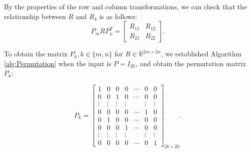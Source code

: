 \documentclass[12pt]{article}
\begin{document}
 \fi

By the properties of the row and column transformations, we can check that the relationship between $R$ and $R_4$ is as follows:
\begin{equation}\label{eq:Rn}
    P_{m} R P_{n}^T = \begin{bmatrix} R_{11} & R_{12}\\R_{21}& R_{22}\end{bmatrix}.
\end{equation}

To obtain the matrix $P_k, k\in \{m,n\}$ for $R \in \mathbb{R}^{2m \times 2n}$, we established Algorithm \ref{alg:Permutation} when the input is $P=I_{2k}$, and obtain the permutation matrix $P_k$:

\begin{equation}\label{p}
    P_k = \begin{bmatrix} 
            1 & 0 & 0 & 0 & \cdots & 0 & 0\\ 
            0 & 0 & 1 & 0 & \cdots & 0 & 0\\ 
            \vdots & \vdots & \vdots & \vdots &  & \vdots & \vdots\\ 
            0 & 0 & 0 & 0 & \cdots & 1 & 0 \\
            0 & 1 & 0 & 0 & \cdots & 0 & 0\\ 
            0 & 0 & 0 & 1 & \cdots & 0 & 0\\ 
            \vdots & \vdots & \vdots & \vdots &  & \vdots & \vdots\\ 
            0 & 0 & 0 & 0 &\cdots & 0 & 1 
        \end{bmatrix}_{2k \times 2k}.
\end{equation}

\end{document}

